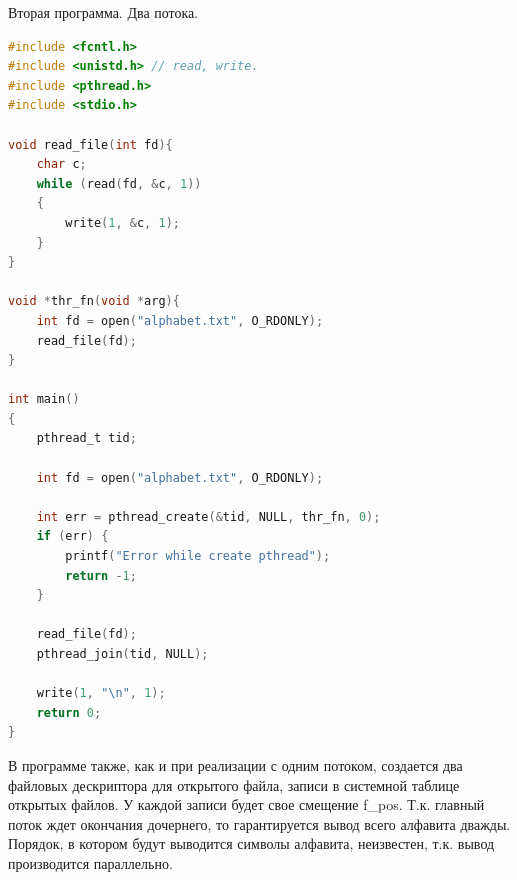 \documentclass[a4paper,oneside,12pt]{extreport}
\begin{document}
\begin{task}
    \begin{figure}[ht!]
    \end{figure}

    Вторая программа. Два потока.
    \begin{lstlisting}[language=C]
#include <fcntl.h>
#include <unistd.h> // read, write.
#include <pthread.h>
#include <stdio.h>

void read_file(int fd){
	char c;
	while (read(fd, &c, 1))
	{
		write(1, &c, 1);
	}
}
	
void *thr_fn(void *arg){
	int fd = open("alphabet.txt", O_RDONLY);
	read_file(fd);
}

int main()
{
	pthread_t tid;
	
	int fd = open("alphabet.txt", O_RDONLY);
	
	int err = pthread_create(&tid, NULL, thr_fn, 0);
	if (err) {
		printf("Error while create pthread");
		return -1;
	}
	
	read_file(fd);
	pthread_join(tid, NULL);
	
	write(1, "\n", 1);
	return 0;
}
    \end{lstlisting}

    В программе также, как и при реализации с одним потоком, создается
    два файловых дескриптора для открытого файла, записи в системной таблице открытых файлов.
    У каждой записи будет свое смещение f\_pos.
    Т.к. главный поток ждет окончания дочернего, то гарантируется вывод
    всего алфавита дважды.
    Порядок, в котором будут выводится символы алфавита, неизвестен,
    т.к. вывод производится параллельно.


    \begin{figure}[ht!]
    \end{figure}

\end{task}
\end{document}
